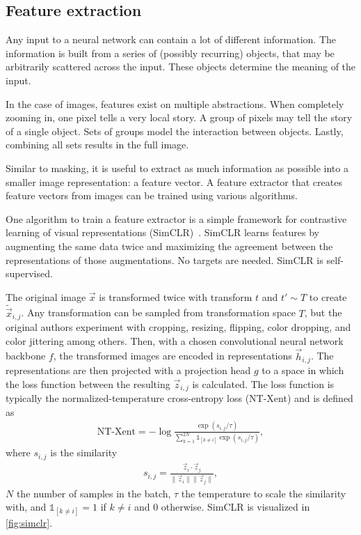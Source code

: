 \subsection{Feature extraction}

Any input to a neural network can contain a lot of different information.
The information is built from a series of (possibly recurring) objects, that may be arbitrarily scattered across the input.
These objects determine the meaning of the input.

In the case of images, features exist on multiple abstractions.
When completely zooming in, one pixel tells a very local story.
A group of pixels may tell the story of a single object.
Sets of groups model the interaction between objects.
Lastly, combining all sets results in the full image.

Similar to masking, it is useful to extract as much information as possible into a smaller image representation: a feature vector.
A feature extractor that creates feature vectors from images can be trained using various algorithms.

One algorithm to train a feature extractor is a simple framework for contrastive learning of visual representations (SimCLR)~.
SimCLR learns features by augmenting the same data twice and maximizing the agreement between the representations of those augmentations.
No targets are needed.
SimCLR is self-supervised.

The original image $\vec{x}$ is transformed twice with transform $t$ and $t' \sim T$ to create $\tilde{\vec{x}}_{i,j}$.
Any transformation can be sampled from transformation space $T$, but the original authors experiment with cropping, resizing, flipping, color dropping, and color jittering among others.
Then, with a chosen convolutional neural network backbone $f$, the transformed images are encoded in representations $\vec{h}_{i,j}$.
The representations are then projected with a projection head $g$ to a space in which the loss function between the resulting $\vec{z}_{i,j}$ is calculated.
The loss function is typically the normalized-temperature cross-entropy loss (NT-Xent) and is defined as
\begin{align}
    \text{NT-Xent} = - \log \frac{\exp(s_{i,j} / \tau)}{\sum_{k=1}^{2N}\mathbb{1}_{[k\neq i]}\exp(s_{i,j} / \tau)},
\end{align}
where $s_{i,j}$ is the similarity
\begin{align}
    s_{i,j} = \frac{\vec{z}_i \cdot \vec{z}_j }{\|\vec{z}_i\|\|\vec{z}_j\|},
\end{align}
$N$ the number of samples in the batch, $\tau$ the temperature to scale the similarity with, and $\mathbb{1}_{[k\neq i]}=1$ if $k \neq i$ and 0 otherwise.
SimCLR is visualized in \cref{fig:simclr}.


